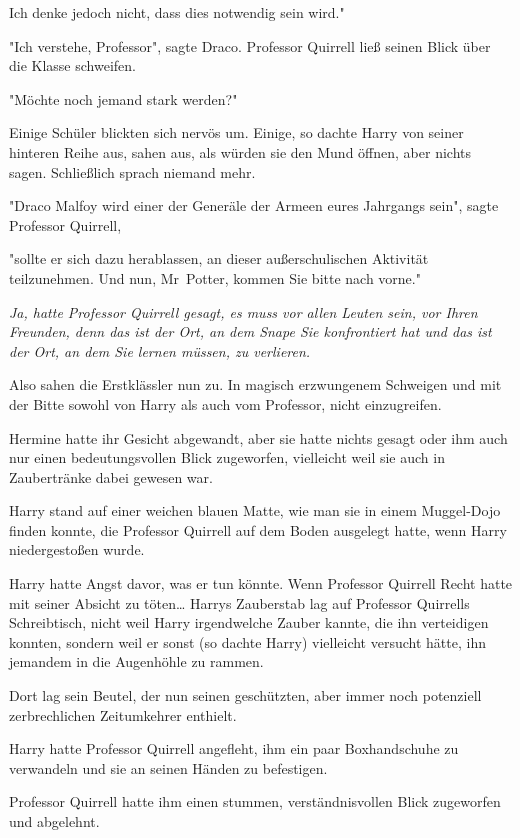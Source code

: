{Ich denke jedoch nicht, dass dies notwendig sein wird."

"Ich verstehe, Professor", sagte Draco. Professor Quirrell ließ seinen Blick über die Klasse schweifen.

"Möchte noch jemand stark werden?"

Einige Schüler blickten sich nervös um. Einige, so dachte Harry von seiner hinteren Reihe aus, sahen aus, als würden sie den Mund öffnen, aber nichts sagen. Schließlich sprach niemand mehr.

"Draco Malfoy wird einer der Generäle der Armeen eures Jahrgangs sein", sagte Professor Quirrell,

"sollte er sich dazu herablassen, an dieser außerschulischen Aktivität teilzunehmen. Und nun, Mr~Potter, kommen Sie bitte nach vorne."

\emph{Ja, hatte Professor Quirrell gesagt, es muss vor allen Leuten sein, vor Ihren Freunden, denn das ist der Ort, an dem Snape Sie konfrontiert hat und das ist der Ort, an dem Sie lernen müssen, zu verlieren.}

Also sahen die Erstklässler nun zu. In magisch erzwungenem Schweigen und mit der Bitte sowohl von Harry als auch vom Professor, nicht einzugreifen.

Hermine hatte ihr Gesicht abgewandt, aber sie hatte nichts gesagt oder ihm auch nur einen bedeutungsvollen Blick zugeworfen, vielleicht weil sie auch in Zaubertränke dabei gewesen war.

Harry stand auf einer weichen blauen Matte, wie man sie in einem Muggel-Dojo finden konnte, die Professor Quirrell auf dem Boden ausgelegt hatte, wenn Harry niedergestoßen wurde.

Harry hatte Angst davor, was er tun könnte. Wenn Professor Quirrell Recht hatte mit seiner Absicht zu töten… Harrys Zauberstab lag auf Professor Quirrells Schreibtisch, nicht weil Harry irgendwelche Zauber kannte, die ihn verteidigen konnten, sondern weil er sonst (so dachte Harry) vielleicht versucht hätte, ihn jemandem in die Augenhöhle zu rammen.

Dort lag sein Beutel, der nun seinen geschützten, aber immer noch potenziell zerbrechlichen Zeitumkehrer enthielt.

Harry hatte Professor Quirrell angefleht, ihm ein paar Boxhandschuhe zu verwandeln und sie an seinen Händen zu befestigen.

Professor Quirrell hatte ihm einen stummen, verständnisvollen Blick zugeworfen und abgelehnt.

}
